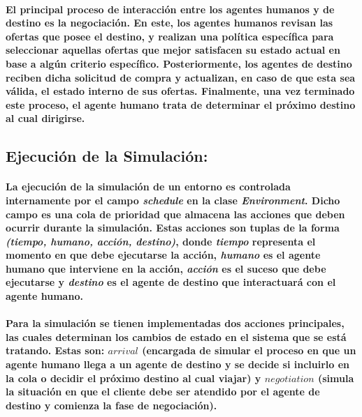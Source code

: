 \documentclass[12pt]{amsart}
\begin{document}
\paragraph{El principal proceso de interacción entre los agentes humanos y de destino es la negociación. En este, los agentes humanos revisan las ofertas que posee el destino, y realizan una política específica para seleccionar aquellas ofertas que mejor satisfacen su estado actual en base a algún criterio específico. Posteriormente, los agentes de destino reciben dicha solicitud de compra y actualizan, en caso de que esta sea válida, el estado interno de sus ofertas. Finalmente, una vez terminado este proceso, el agente humano trata de determinar el próximo destino al cual dirigirse.}

\subsection{Ejecución de la Simulación:}

\paragraph{La ejecución de la simulación de un entorno es controlada internamente por el campo \textit{schedule} en la clase \textit{Environment}. Dicho campo es una cola de prioridad que almacena las acciones que deben ocurrir durante la simulación. Estas acciones son tuplas de la forma \textit{(tiempo, humano, acción, destino)}, donde \textit{tiempo} representa el momento en que debe ejecutarse la acción, \textit{humano} es el agente humano que interviene en la acción, \textit{acción} es el suceso que debe ejecutarse y \textit{destino} es el agente de destino que interactuará con el agente humano.}

\paragraph{Para la simulación se tienen implementadas dos acciones principales, las cuales determinan los cambios de estado en el sistema que se está tratando. Estas son: $arrival$ (encargada de simular el proceso en que un agente humano llega a un agente de destino y se decide si incluirlo en la cola o decidir el próximo destino al cual viajar) y $negotiation$ (simula la situación en que el cliente debe ser atendido por el agente de destino y comienza la fase de negociación).}
\end{document}
